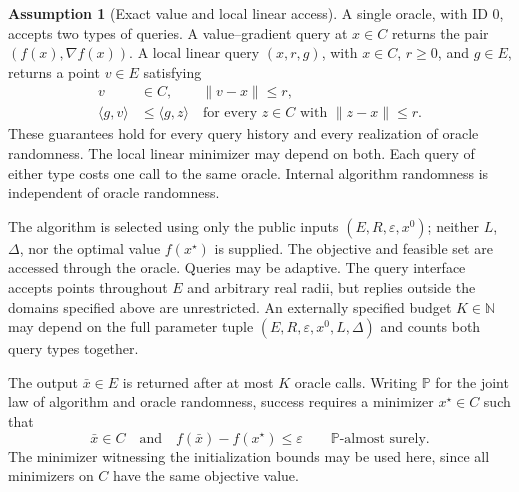 \documentclass[10pt]{article}
\theoremstyle{definition}
\newtheorem{assumption}{Assumption}
\begin{document}
\begin{assumption}[Exact value and local linear access]
A single oracle, with ID $0$, accepts two types of queries. A value--gradient query at $x\in C$ returns the pair $(f(x),\nabla f(x))$. A local linear query $(x,r,g)$, with $x\in C$, $r\geq0$, and $g\in E$, returns a point $v\in E$ satisfying
\[
\begin{aligned}
v&\in C,\qquad \|v-x\|\leq r,\\
\langle g,v\rangle&\leq\langle g,z\rangle
\quad\text{for every }z\in C\text{ with }\|z-x\|\leq r.
\end{aligned}
\]
These guarantees hold for every query history and every realization of oracle randomness. The local linear minimizer may depend on both. Each query of either type costs one call to the same oracle. Internal algorithm randomness is independent of oracle randomness.
\end{assumption}

The algorithm is selected using only the public inputs $(E,R,\varepsilon,x^0)$; neither $L$, $\Delta$, nor the optimal value $f(x^\star)$ is supplied. The objective and feasible set are accessed through the oracle. Queries may be adaptive. The query interface accepts points throughout $E$ and arbitrary real radii, but replies outside the domains specified above are unrestricted. An externally specified budget $K\in\mathbb{N}$ may depend on the full parameter tuple $(E,R,\varepsilon,x^0,L,\Delta)$ and counts both query types together.

The output $\bar{x}\in E$ is returned after at most $K$ oracle calls. Writing $\mathbb{P}$ for the joint law of algorithm and oracle randomness, success requires a minimizer $x^\star\in C$ such that
\[
\bar{x}\in C
\quad\text{and}\quad
f(\bar{x})-f(x^\star)\leq\varepsilon
\qquad \mathbb{P}\text{-almost surely}.
\]
The minimizer witnessing the initialization bounds may be used here, since all minimizers on $C$ have the same objective value.
\end{document}
